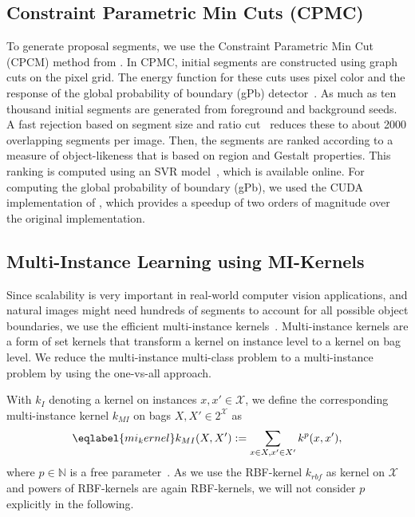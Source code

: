 \subsection{Constraint Parametric Min Cuts (CPMC)}
To generate proposal segments, we use the Constraint Parametric Min Cut (CPCM)
method from \citet{carreira2010constrained}. In CPMC, initial segments are
constructed using graph cuts on the pixel grid. The energy function for these cuts
uses pixel color and the response of the global probability of boundary (gPb)
detector~\citep{maire2008using}. As much as ten thousand initial segments are
generated from foreground and background seeds. A fast rejection based on
segment size and ratio cut~\citep{wang2003image} reduces these to about 2000
overlapping segments per image. Then, the segments are ranked according to a
measure of object-likeness that is based on region and Gestalt properties.
This ranking is computed using an SVR model~\citep{carreira2010constrained},
which is available online. 
For computing the global probability of boundary
(gPb), we used the CUDA implementation of \citet{catanzaro2009efficient}, which
provides a speedup of two orders of magnitude over the original implementation.

\subsection{Multi-Instance Learning using MI-Kernels}
Since scalability is very important in real-world computer vision applications,
and natural images might need hundreds of segments to account for all possible
object boundaries, we use the efficient multi-instance
kernels~\citep{gaertner2002multi}.  Multi-instance kernels are a form of set
kernels %
 that transform a kernel on instance level to a kernel on bag level.  We
reduce the multi-instance multi-class problem to a multi-instance problem by
using the one-vs-all approach.

With $k_I$ denoting a kernel on instances $x,x' \in \mathcal{X}$, we define the
corresponding multi-instance kernel $k_{MI}$ on bags $X,X' \in 2^\mathcal{X}$
as
\begin{equation}\eqlabel{mi_kernel}
k_{MI}(X,X') := \sum_{x \in X, x' \in X'} k^p(x,x'),
\end{equation}
where $p \in \mathbb{N}$ is a free parameter~\citep{gaertner2002multi}. As we use
the RBF-kernel $k_{rbf}$ as kernel on $\mathcal{X}$ and powers of RBF-kernels
are again RBF-kernels, we will not consider $p$ explicitly in the following.

